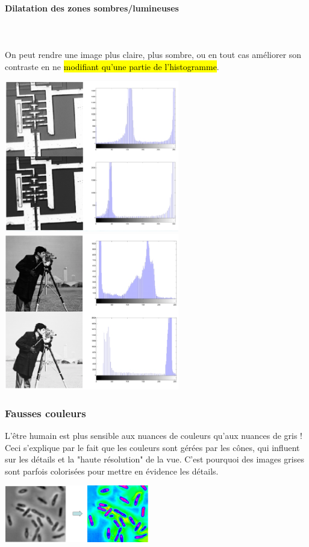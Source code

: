 \documentclass[letterpaper, 12pt]{article}
\newcommand{\alinea}{
\hspace*{0.5cm}}
\begin{document}
			\paragraph{Dilatation des zones sombres/lumineuses}~\\~\\
				\alinea On peut rendre une image plus claire, plus sombre, ou en tout cas améliorer son contraste en ne \hl{modifiant
					qu'une partie de l'histogramme}.
				\begin{center}
					\includegraphics[width=3in]{Images/histo3} \hfill \includegraphics[width=3in]{Images/histo4}
				\end{center}
		\subsubsection{Fausses couleurs}
			\alinea L'être humain est plus sensible aux nuances de couleurs qu'aux nuances de gris ! Ceci s'explique par le fait
				que les couleurs sont gérées par les cônes, qui influent sur les détails et la "haute résolution" de la vue.
				C'est pourquoi des images grises sont parfois colorisées pour mettre en évidence les détails.
				\begin{center}
					\includegraphics[width=2.5in]{Images/false}
				\end{center}
%
\pagebreak
%
\end{document}
